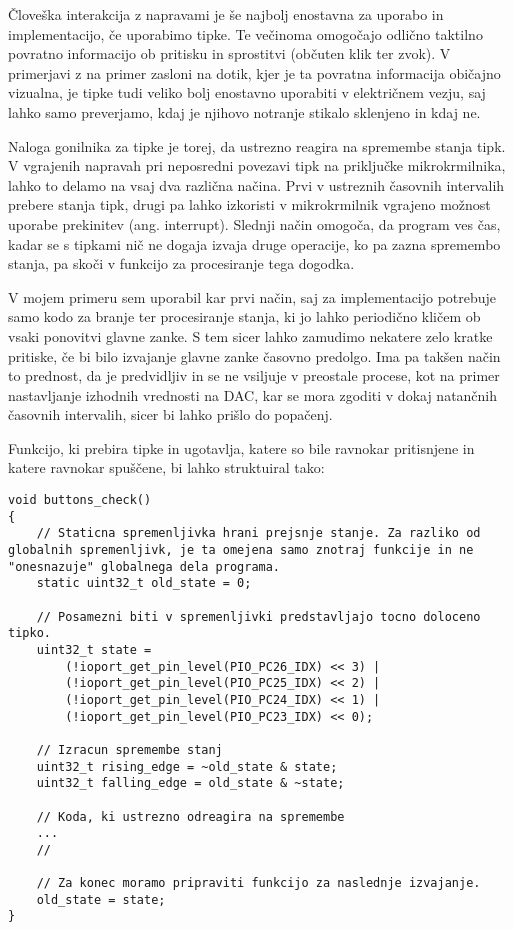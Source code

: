 \documentclass[12pt,a4paper,twoside,openright,slovene]{book}
\begin{document}
Človeška interakcija z napravami je še najbolj enostavna za uporabo in implementacijo, če uporabimo tipke. Te večinoma omogočajo odlično taktilno povratno informacijo ob pritisku in sprostitvi (občuten klik ter zvok). V primerjavi z na primer zasloni na dotik, kjer je ta povratna informacija običajno vizualna, je tipke tudi veliko bolj enostavno uporabiti v električnem vezju, saj lahko samo preverjamo, kdaj je njihovo notranje stikalo sklenjeno in kdaj ne.

Naloga gonilnika za tipke je torej, da ustrezno reagira na spremembe stanja tipk. V vgrajenih napravah pri neposredni povezavi tipk na priključke mikrokrmilnika, lahko to delamo na vsaj dva različna načina. Prvi v ustreznih časovnih intervalih prebere stanja tipk, drugi pa lahko izkoristi v mikrokrmilnik vgrajeno možnost uporabe prekinitev (ang. interrupt). Slednji način omogoča, da program ves čas, kadar se s tipkami nič ne dogaja izvaja druge operacije, ko pa zazna spremembo stanja, pa skoči v funkcijo za procesiranje tega dogodka.

V mojem primeru sem uporabil kar prvi način, saj za implementacijo potrebuje samo kodo za branje ter procesiranje stanja, ki jo lahko periodično kličem ob vsaki ponovitvi glavne zanke. S tem sicer lahko zamudimo nekatere zelo kratke pritiske, če bi bilo izvajanje glavne zanke časovno predolgo. Ima pa takšen način to prednost, da je predvidljiv in se ne vsiljuje v preostale procese, kot na primer nastavljanje izhodnih vrednosti na DAC, kar se mora zgoditi v dokaj natančnih časovnih intervalih, sicer bi lahko prišlo do popačenj.

Funkcijo, ki prebira tipke in ugotavlja, katere so bile ravnokar pritisnjene in katere ravnokar spuščene, bi lahko struktuiral tako:

\begin{lstlisting}
void buttons_check()
{
	// Staticna spremenljivka hrani prejsnje stanje. Za razliko od globalnih spremenljivk, je ta omejena samo znotraj funkcije in ne "onesnazuje" globalnega dela programa.
	static uint32_t old_state = 0;
	
	// Posamezni biti v spremenljivki predstavljajo tocno doloceno tipko.
	uint32_t state =
		(!ioport_get_pin_level(PIO_PC26_IDX) << 3) |
		(!ioport_get_pin_level(PIO_PC25_IDX) << 2) |
		(!ioport_get_pin_level(PIO_PC24_IDX) << 1) |
		(!ioport_get_pin_level(PIO_PC23_IDX) << 0);
	
	// Izracun spremembe stanj
	uint32_t rising_edge = ~old_state & state;
	uint32_t falling_edge = old_state & ~state;
	
	// Koda, ki ustrezno odreagira na spremembe
	...
	//
	
	// Za konec moramo pripraviti funkcijo za naslednje izvajanje.
	old_state = state;
}
\end{lstlisting}
\end{document}
